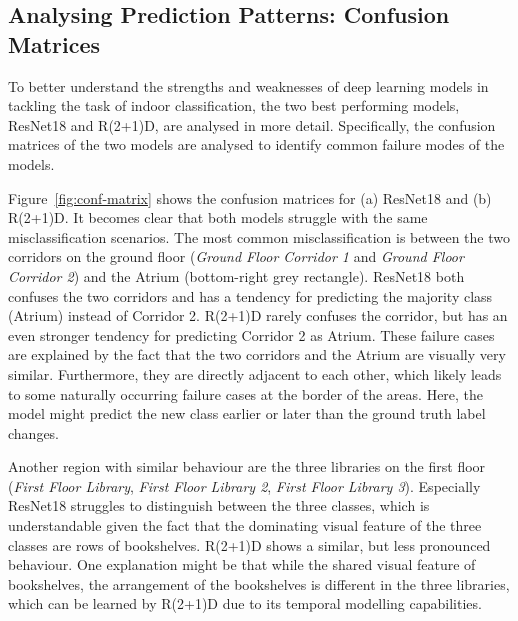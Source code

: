 \documentclass[a4paper]{article}
\begin{document}

  \subsection{Analysing Prediction Patterns: Confusion Matrices} %
  \label{sub:conf-matrices}
  
  To better understand the strengths and weaknesses of deep learning models in
  tackling the task of indoor classification, the two best performing models,
  ResNet18 and R(2+1)D, are analysed in more detail. Specifically, the confusion
  matrices of the two models are analysed to identify common failure modes of
  the models.

  Figure~\ref{fig:conf-matrix} shows the confusion matrices for (a) ResNet18 and
  (b) R(2+1)D. It becomes clear that both models struggle with the same
  misclassification scenarios. The most common misclassification is between the
  two corridors on the ground floor (\textit{Ground Floor Corridor 1} and
  \textit{Ground Floor Corridor 2}) and the Atrium (bottom-right grey
  rectangle). ResNet18 both confuses the two corridors and has a tendency for
  predicting the majority class (Atrium) instead of Corridor 2. R(2+1)D rarely
  confuses the corridor, but has an even stronger tendency for predicting
  Corridor 2 as Atrium. These failure cases are explained by the fact that the
  two corridors and the Atrium are visually very similar. Furthermore, they are
  directly adjacent to each other, which likely leads to some naturally
  occurring failure cases at the border of the areas. Here, the model might
  predict the new class earlier or later than the ground truth label changes.

  Another region with similar behaviour are the three libraries on the first
  floor (\textit{First Floor Library}, \textit{First
  Floor Library 2}, \textit{First Floor Library 3}). Especially ResNet18
  struggles to distinguish between the three classes, which is understandable
  given the fact that the dominating visual feature of the three classes are 
  rows of bookshelves. R(2+1)D shows a similar, but less pronounced behaviour.
  One explanation might be that while the shared visual feature of bookshelves,
  the arrangement of the bookshelves is different in the three libraries, which
  can be learned by R(2+1)D due to its temporal modelling capabilities.
\end{document}
